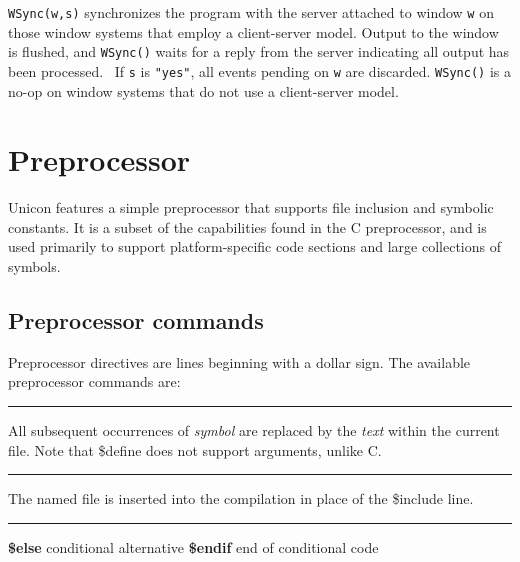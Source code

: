 \noindent
\texttt{WSync(w,s)} synchronizes the program with the server attached to
window \texttt{w} on those window systems that employ a client-server
model. Output to the window is flushed, and \texttt{WSync()} waits
for a reply from the server indicating all output has been processed.
\ If \texttt{s} is \texttt{"yes"}, all
events pending on \texttt{w} are discarded. \texttt{WSync()} is a no-op
on window systems that do not use a client-server model.

\section{Preprocessor}

Unicon features a simple preprocessor that supports file
inclusion and symbolic constants. It is a subset of the capabilities found in
the C preprocessor, and is used primarily to support platform-specific code
sections and large collections of symbols.

\subsection*{Preprocessor commands}

Preprocessor directives are lines beginning with a dollar sign. The
available preprocessor commands are:

\bigskip\hrule\vspace{0.1cm}

\noindent
{}All subsequent occurrences of \textit{symbol} are
replaced by the \textit{text} within the current file. Note that
\$define does not support arguments, unlike C.

\bigskip\hrule\vspace{0.1cm}

\noindent
{}The named file is inserted into the compilation in place
of the \$include line.

\bigskip\hrule\vspace{0.1cm}

\noindent{}
\linebreak
{\textbf{\$else} \hfill conditional alternative}
\linebreak
{\textbf{\$endif} \hfill end of conditional code}

